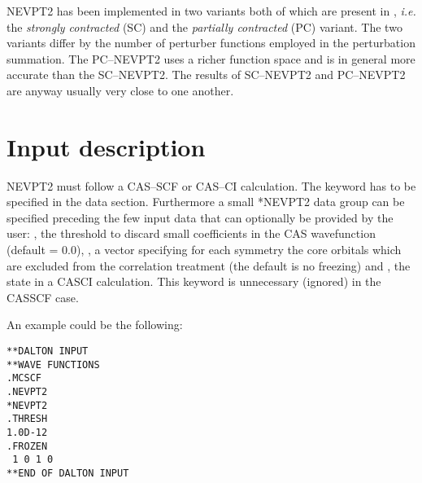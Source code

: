 NEVPT2 has been implemented in two variants both of which are present
in \dalton, {\it i.e.\/} the \emph{strongly contracted} (SC) and the
\emph{partially contracted} (PC) variant. The two variants differ by
the number of perturber functions employed in the perturbation
summation. The PC--NEVPT2 uses a richer function space and is
in general more accurate than the SC--NEVPT2. The results of
SC--NEVPT2 and PC--NEVPT2 are anyway usually very close to one
another.

\begin{center}
\end{center}

\section{Input description}\label{sec:nevpt2input}

NEVPT2 must follow a CAS--SCF or CAS--CI calculation. The keyword
 has to be specified in the  data
section. Furthermore a small {*NEVPT2} data group
 can be specified preceding the few input data that can
optionally be provided by the user:
,
the threshold to discard small coefficients in the CAS wavefunction
(default = 0.0),
,
a vector specifying for each symmetry the core orbitals which are
excluded from the correlation treatment (the default is no
freezing) and
,
the state in a CASCI calculation. This keyword is unnecessary
(ignored) in the CASSCF case.

An example could be the following:

\begin{verbatim}
**DALTON INPUT
**WAVE FUNCTIONS
.MCSCF
.NEVPT2
*NEVPT2
.THRESH
1.0D-12
.FROZEN
 1 0 1 0
**END OF DALTON INPUT
\end{verbatim}
